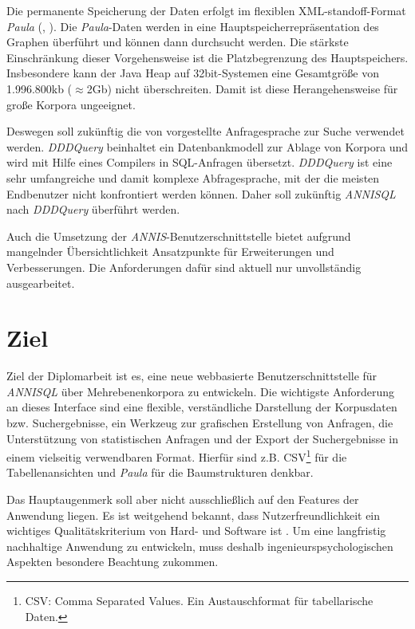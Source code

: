 Die permanente Speicherung der Daten erfolgt im flexiblen XML-standoff-Format \emph{Paula} (\citet[]{dipper2005}, \citet[]{woerner2006}). Die \emph{Paula}-Daten werden in eine Hauptspeicherrepräsentation des Graphen überführt und können dann durchsucht werden. Die stärkste Einschränkung dieser Vorgehensweise ist die Platzbegrenzung des Hauptspeichers. Insbesondere kann der Java Heap auf 32bit-Systemen eine Gesamtgröße von 1.996.800kb ($\approx$2Gb) nicht überschreiten. Damit ist diese Herangehensweise für große Korpora ungeeignet.

Deswegen soll zukünftig die von \citet{dddquery-springer} vorgestellte Anfragesprache zur Suche verwendet werden. \emph{DDDQuery} beinhaltet ein Datenbankmodell zur Ablage von Korpora und wird mit Hilfe eines Compilers in SQL-Anfragen übersetzt. \emph{DDDQuery}  ist eine sehr umfangreiche und damit komplexe Abfragesprache, mit der die meisten Endbenutzer nicht konfrontiert werden können. Daher soll zukünftig \emph{ANNISQL} nach \emph{DDDQuery} überführt werden.

Auch die Umsetzung der \emph{ANNIS}-Benutzerschnittstelle bietet aufgrund mangelnder Übersichtlichkeit Ansatzpunkte für Erweiterungen und Verbesserungen. Die Anforderungen dafür sind aktuell nur unvollständig ausgearbeitet.

\section{Ziel}

Ziel der Diplomarbeit ist es, eine neue webbasierte Benutzerschnittstelle für \emph{ANNISQL} über Mehrebenenkorpora zu entwickeln. Die wichtigste Anforderung an dieses Interface sind eine flexible, verständliche Darstellung der Korpusdaten bzw. Suchergebnisse, ein Werkzeug zur grafischen Erstellung von Anfragen, die Unterstützung von statistischen Anfragen und der Export der Suchergebnisse in einem vielseitig verwendbaren Format. Hierfür sind z.B. CSV\footnote{CSV: Comma Separated Values. Ein Austauschformat für tabellarische Daten.} für die Tabellenansichten und \emph{Paula} für die Baumstrukturen denkbar.

Das Hauptaugenmerk soll aber nicht ausschließlich auf den Features  der Anwendung liegen. Es ist weitgehend bekannt, dass Nutzerfreundlichkeit ein wichtiges Qualitätskriterium von Hard- und Software ist \citep[][]{mayhew94}. Um eine langfristig nachhaltige Anwendung zu entwickeln, muss deshalb ingenieurspsychologischen Aspekten besondere Beachtung zukommen.


